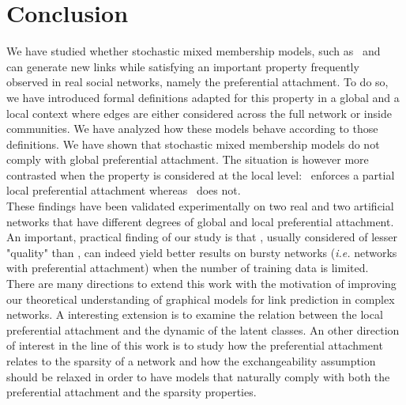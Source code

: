 
\section{Conclusion}
\label{sec:concl}

We have studied whether stochastic mixed membership models, such as \ifm\ and \imb\, can generate new links while satisfying an important property frequently observed in real social networks, namely the preferential attachment. To do so, we have introduced formal definitions adapted for this property in a global and a local context where edges are either considered across the full network or inside communities. We have analyzed how these models behave according to those definitions. We  have shown that stochastic mixed membership models do not comply with global preferential attachment. The situation is however more contrasted when the property is considered at the local level: \imb\ enforces a partial local preferential attachment whereas \ifm\ does not.~\\

These findings have been validated experimentally on two real and two artificial networks that have different degrees of global and local preferential attachment. An important, practical finding of our study is that \imb, usually considered of lesser "quality" than \ifm, can indeed yield better results on bursty networks (\textit{i.e.} networks with preferential attachment) when the number of training data is limited.~\\

There are many directions to extend this work with the motivation of improving our theoretical understanding of graphical models for link prediction in complex networks. A interesting extension is to examine the relation between the local preferential attachment and the dynamic of the latent classes.
An other direction of interest in the line of this work is to study how the preferential attachment relates to the sparsity of a network and how the exchangeability assumption should be relaxed in order to have models that naturally comply with both the preferential attachment and the sparsity properties.


